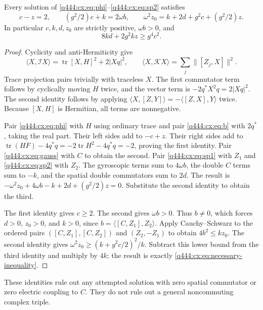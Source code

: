 \begin{proposition}\label{q444:cx:prop:universal}
Every solution of \eqref{q444:cx:eq:phi}--\eqref{q444:cx:eq:sp2} satisfies
\begin{equation}\label{q444:cx:eq:universal}
 c-z=2,\qquad (g^2/2)c+k=2\omega b,\qquad
 \omega^2z_0=k+2d+g^2c+(g^2/2)z.
\end{equation}
In particular $c,k,d,z_0$ are strictly positive, $\omega b>0$, and
\begin{equation}\label{q444:cx:eq:necessary-inequality}
 8kd+2g^2kz\geq g^4c^2.
\end{equation}
\end{proposition}
\begin{proof}
Cyclicity and anti-Hermiticity give
\[
 \langle X,\mathcal IX\rangle=\operatorname{tr}[X,H]^2+2|Xq|^2,
 \qquad
 \langle X,\mathcal KX\rangle=\sum_j\|[Z_j,X]\|^2.
\]
Trace projection pairs trivially with traceless $X$. The first
commutator term follows by cyclically moving $H$ twice, and the vector
term is $-2q^*X^2q=2|Xq|^2$. The second identity follows by applying
$\langle X,[Z,Y]\rangle=-\langle[Z,X],Y\rangle$ twice.
Because $[X,H]$ is Hermitian, all terms are nonnegative.

Pair \eqref{q444:cx:eq:phi} with $H$ using ordinary trace and pair
\eqref{q444:cx:eq:b} with $2q^*$, taking the real part. Their left sides add
to $-c+z$. Their right sides add to
$\operatorname{tr}(HF)-4q^*q=-2\operatorname{tr} H^2-4q^*q=-2$, proving the first identity.
Pair \eqref{q444:cx:eq:gauss} with $C$ to obtain the second.
Pair \eqref{q444:cx:eq:sp1} with $Z_1$ and \eqref{q444:cx:eq:sp2} with $Z_2$.
The gyroscopic terms sum to $4\omega b$, the double $C$ terms sum to
$-k$, and the spatial double commutators sum to $2d$.
The result is
$-\omega^2z_0+4\omega b-k+2d+(g^2/2)z=0$.
Substitute the second identity to obtain the third.

The first identity gives $c\geq2$. The second gives $\omega b>0$.
Thus $b\ne0$, which forces $d>0$, $z_0>0$, and $k>0$, since
$b=\langle[C,Z_1],Z_2\rangle$.
Apply Cauchy--Schwarz to the ordered pairs
$([C,Z_1],[C,Z_2])$ and $(Z_2,-Z_1)$ to obtain
$4b^2\leq kz_0$.
The second identity gives
$\omega^2z_0\geq(k+g^2c/2)^2/k$.
Subtract this lower bound from the third identity and multiply by $4k$;
the result is exactly \eqref{q444:cx:eq:necessary-inequality}.
\end{proof}

These identities rule out any attempted solution with zero spatial
commutator or zero electric coupling to $C$. They do not rule out a
general noncommuting complex triple.


